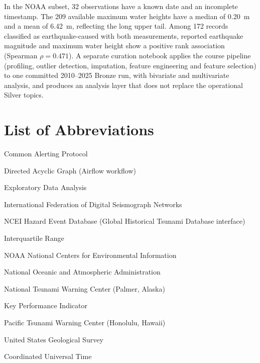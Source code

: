 \documentclass[a4paper,11pt,oneside]{book}
\begin{document}
In the NOAA subset, 32 observations have a known date and an incomplete timestamp. The 209 available maximum water heights have a median of 0.20~m and a mean of 6.42~m, reflecting the long upper tail. Among 172 records classified as earthquake-caused with both measurements, reported earthquake magnitude and maximum water height show a positive rank association (Spearman $\rho=0.471$). A separate curation notebook applies the course pipeline (profiling, outlier detection, imputation, feature engineering and feature selection) to one committed 2010--2025 Bronze run, with bivariate and multivariate analysis, and produces an analysis layer that does not replace the operational Silver topics.

    \setcounter{tocdepth}{0}
    \tableofcontents
    \setcounter{tocdepth}{1}
    \listoffigures
    \listoftables

    \chapter*{List of Abbreviations}
    \begin{abbrv}
        \item[CAP]      Common Alerting Protocol
        \item[DAG]      Directed Acyclic Graph (Airflow workflow)
        \item[EDA]      Exploratory Data Analysis
        \item[FDSN]     International Federation of Digital Seismograph Networks
        \item[HazEL]    NCEI Hazard Event Database (Global Historical Tsunami Database interface)
        \item[IQR]      Interquartile Range
        \item[NCEI]     NOAA National Centers for Environmental Information
        \item[NOAA]     National Oceanic and Atmospheric Administration
        \item[NTWC]     National Tsunami Warning Center (Palmer, Alaska)
        \item[KPI]      Key Performance Indicator
        \item[PTWC]     Pacific Tsunami Warning Center (Honolulu, Hawaii)
        \item[USGS]     United States Geological Survey
        \item[UTC]      Coordinated Universal Time
    \end{abbrv}
\end{document}
